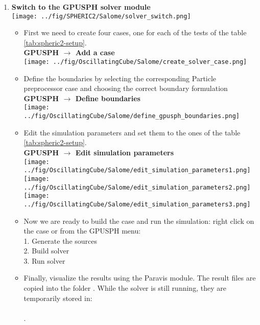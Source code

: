\documentclass{../GPUSPHtemplate}
\begin{document}
\begin{enumerate}
\item \textbf{Switch to the GPUSPH solver module}  \smallskip\\
  \texttt{[image: ../fig/SPHERIC2/Salome/solver\_switch.png]}
  \begin{itemize}
  \item First we need to create four cases, one for each of the tests of the table \ref{tab:spheric2-setup}.\\
    \textbf{GPUSPH $\to$ Add a case}\smallskip\\
    \texttt{[image: ../fig/OscillatingCube/Salome/create\_solver\_case.png]}
  \item Define the boundaries by selecting the corresponding Particle preprocessor case and choosing the correct boundary formulation\\
    \textbf{GPUSPH $\to$ Define boundaries}\smallskip\\
    \texttt{[image: ../fig/OscillatingCube/Salome/define\_gpusph\_boundaries.png]}
  \item Edit the simulation parameters and set them to the ones of the table \ref{tab:spheric2-setup}.\\
    \textbf{GPUSPH $\to$ Edit simulation parameters}\smallskip\\
    \texttt{[image: ../fig/OscillatingCube/Salome/edit\_simulation\_parameters1.png]}\\
    \texttt{[image: ../fig/OscillatingCube/Salome/edit\_simulation\_parameters2.png]}\\
    \texttt{[image: ../fig/OscillatingCube/Salome/edit\_simulation\_parameters3.png]}\medskip
  \item Now we are ready to build the case and run the simulation: right click on the case or from the GPUSPH menu:\\
    1. Generate the sources\\
    2. Build solver\\
    3. Run solver
  \item Finally, visualize the results using the Paravis module. The result files are copied into the folder
    . While the solver is still running, they are temporarily stored in:\\
    \\
    .
  \end{itemize}
\end{enumerate}
\end{document}
